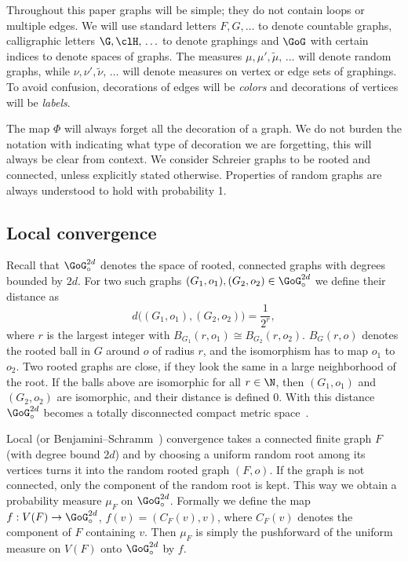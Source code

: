 Throughout this paper graphs will be simple; they do not contain loops or multiple edges. We will use standard letters $F,G, \ldots$ to denote countable graphs, calligraphic letters $\G, \clH,\,\ldots$ to denote graphings and $\GoG$ with certain indices to denote spaces of graphs. The measures $\mu, \mu', \widetilde{\mu},\,\ldots$ will denote random graphs, while $\nu, \nu', \widetilde{\nu},\,\ldots$ will denote measures on vertex or edge sets of graphings. To avoid confusion, decorations of edges will be \emph{colors} and decorations of vertices will be \emph{labels}.

The map $\Phi$ will always forget all the decoration of a graph. We do not burden the notation with indicating what type of decoration we are forgetting, this will always be clear from context. We consider Schreier graphs to be rooted and connected, unless explicitly stated otherwise. Properties of random graphs are always understood to hold with probability 1.

\subsection{Local convergence}

Recall that $\GoG_{\circ}^{2d}$ denotes the space of rooted, connected graphs with degrees bounded by $2d$. For two such graphs $(G_1, o_1), (G_2, o_2) \in \GoG_{\circ}^{2d}$ we define their distance as
\[
d\big(\left(G_1, o_1\right), \left(G_2, o_2\right)\big) = \frac{1}{2^r},
\]
where $r$ is the largest integer with $B_{G_1}(r,o_1) \cong B_{G_2}(r,o_2)$. $B_G(r,o)$ denotes the rooted ball in $G$ around $o$ of radius $r$, and the isomorphism has to map $o_1$ to $o_2$. Two rooted graphs are close, if they look the same in a large neighborhood of the root. If the balls above are isomorphic for all $r \in \N$, then $(G_1,o_1)$ and $(G_2,o_2)$ are isomorphic, and their distance is defined 0. With this distance $\GoG_{\circ}^{2d}$ becomes a totally disconnected compact metric space~\cite[Section~18.3.1]{lovasz2012large}.

Local (or Benjamini--Schramm~\cite{benjamini2001}) convergence takes a connected finite graph $F$ (with degree bound $2d$) and by choosing a uniform random root among its vertices turns it into the random rooted graph $(F,o)$. If the graph is not connected, only the component of the random root is kept. This way we obtain a probability measure $\mu_F$ on $\GoG_{\circ}^{2d}$. Formally we define the map $f:V(F) \to \GoG_{\circ}^{2d}$, $f(v) = (C_F(v),v)$, where $C_F(v)$ denotes the component of $F$ containing $v$. Then $\mu_F$ is simply the pushforward of the uniform measure on $V(F)$ onto $\GoG_{\circ}^{2d}$ by $f$.

